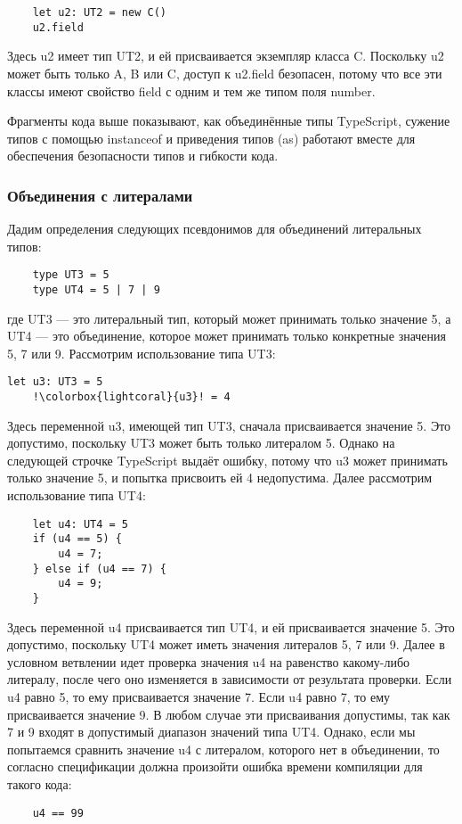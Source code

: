 \begin{lstlisting}
    let u2: UT2 = new C()
    u2.field
\end{lstlisting}
Здесь u2 имеет тип UT2, и ей присваивается экземпляр класса C.
Поскольку u2 может быть только A, B или C, доступ к u2.field безопасен, потому что все эти классы имеют свойство field
с одним и тем же типом поля number.

Фрагменты кода выше показывают, как объединённые типы TypeScript, сужение типов с помощью instanceof и приведения типов
(as) работают вместе для обеспечения безопасности типов и гибкости кода.

\subsubsection{Объединения с литералами}

Дадим определения следующих псевдонимов для объединений литеральных типов:

\begin{lstlisting}
    type UT3 = 5
    type UT4 = 5 | 7 | 9
\end{lstlisting}
где UT3 — это литеральный тип, который может принимать только значение 5, а UT4 — это объединение, которое может
принимать только конкретные значения 5, 7 или 9.
Рассмотрим использование типа UT3:

\begin{lstlisting}[escapechar=!]
    let u3: UT3 = 5
    !\colorbox{lightcoral}{u3}! = 4
\end{lstlisting}
Здесь переменной u3, имеющей тип UT3, сначала присваивается значение 5.
Это допустимо, поскольку UT3 может быть только литералом 5.
Однако на следующей строчке TypeScript выдаёт ошибку, потому что u3 может принимать только значение 5, и попытка
присвоить ей 4 недопустима.
Далее рассмотрим использование типа UT4:
\begin{lstlisting}
    let u4: UT4 = 5
    if (u4 == 5) {
        u4 = 7;
    } else if (u4 == 7) {
        u4 = 9;
    }
\end{lstlisting}
Здесь переменной u4 присваивается тип UT4, и ей присваивается значение 5.
Это допустимо, поскольку UT4 может иметь значения литералов 5, 7 или 9.
Далее в условном ветвлении идет проверка значения u4 на равенство какому-либо литералу, после чего оно изменяется в
зависимости от результата проверки.
Если u4 равно 5, то ему присваивается значение 7.
Если u4 равно 7, то ему присваивается значение 9.
В любом случае эти присваивания допустимы, так как 7 и 9 входят в допустимый диапазон значений типа UT4.
Однако, если мы попытаемся сравнить значение u4 с литералом, которого нет в объединении, то согласно спецификации
должна произойти ошибка времени компиляции для такого кода:
\begin{lstlisting}
    u4 == 99
\end{lstlisting}

